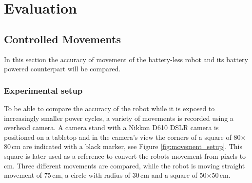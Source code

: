 \chapter{Evaluation} 

\section{Controlled Movements}
\label{sec:controlled_movements}




In this section the accuracy of movement of the battery-less robot and its battery powered counterpart will be compared.

\subsection{Experimental setup}

To be able to compare the accuracy of the robot while it is exposed to increasingly smaller power cycles, a variety of movements is recorded using a overhead camera.
A camera stand with a Nikkon D610 DSLR camera is positioned on a tabletop and in the camera's view the corners of a square of 80$\times$80\,cm are indicated with a black marker, see Figure \ref{fig:movement_setup}.
This square is later used as a reference to convert the robots movement from pixels to cm.
Three different movements are compared, while the robot is moving straight movement of 75\,cm, a circle with radius of 30\,cm and a square of 50$\times$50\,cm.

